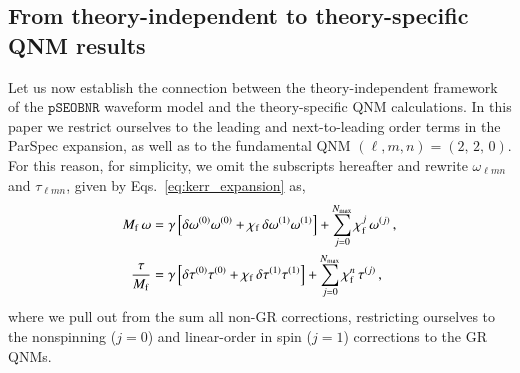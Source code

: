 \documentclass[twocolumn,
               prd,
               aps,
               superscriptaddress,
               tightenlines,
               nofootinbib,
               eqsecnum,
               amsfonts,
               amsmath,
               longbibliography]{revtex4-1}
\newcommand{\pSEOB}{\texttt{pSEOBNR}}
\begin{document}

\subsection{From theory-independent to theory-specific QNM results}
\label{sec:theory_specific_qnm}

Let us now establish the connection between the theory-independent framework of the
$\pSEOB$ waveform model and the theory-specific QNM calculations. In this paper we restrict ourselves
to the leading and next-to-leading order terms in the ParSpec expansion, as well as to the fundamental QNM
$(\ell, m, n) = (2,\, 2,\, 0)$. For this reason, for simplicity, we omit the subscripts hereafter
and rewrite $\omega_{\ell m n}$ and $\tau_{\ell m n}$, given by Eqs.~\eqref{eq:kerr_expansion} as,
%
\begin{subequations}
\label{eq:qnm_nongr_iso}
\begin{align}
    M_{\rm f}\, \omega &= \gamma \left [ \delta\omega^{(0)} \omega^{(0)} + \chi_{\rm f}\, \delta\omega^{(1)} \omega^{(1)} \right ]
    + \sum_{j=0}^{N_{\rm max}} \chi^{j}_{\rm f}\, \omega^{(j)} \,,
\\
    \frac{\tau}{M_{\rm f}}   &= \gamma \left [ \delta\tau^{(0)} \tau^{(0)} + \chi_{\rm f}\, \delta\tau^{(1)} \tau^{(1)} \right ]
    + \sum_{j=0}^{N_{\rm max}} \chi^{n}_{\rm f}\, \tau^{(j)}\,,
\end{align}
\end{subequations}
%
where we pull out from the sum all non-GR corrections, restricting
ourselves to the nonspinning ($j=0$) and linear-order in spin ($j=1$)
corrections to the GR QNMs.
\end{document}
